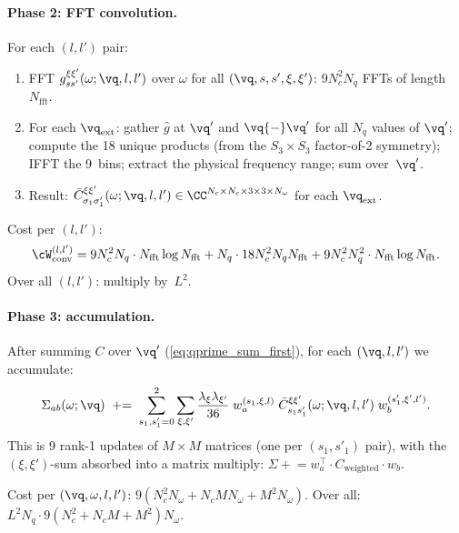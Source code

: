 \paragraph{Phase 2: FFT convolution.}
For each $(l, l')$ pair:
\begin{enumerate}
  \item FFT $g_{ss'}^{\xi\xi'}(\omega; \vq, l, l')$ over $\omega$
    for all $(\vq, s, s', \xi, \xi')$:
    $9 N_c^2 N_q$ FFTs of length $N_\mathrm{fft}$.
  \item For each $\vq_\mathrm{ext}$: gather $\hat{g}$ at $\vq'$ and
    $\vq{-}\vq'$ for all $N_q$ values of $\vq'$; compute the 18 unique
    products (from the $S_3\times S_3$ factor-of-2 symmetry); IFFT the
    9~bins; extract the physical frequency range; sum over~$\vq'$.
  \item Result:
    $\bar{C}^{\xi\xi'}_{\sigma_1\sigma'_1}(\omega; \vq, l, l')
    \in \CC^{N_c \times N_c \times 3 \times 3 \times N_\omega}$
    for each $\vq_\mathrm{ext}$.
\end{enumerate}
Cost per $(l, l')$:
\begin{equation}
  \cW_\mathrm{conv}^{(l,l')}
  = 9 N_c^2 N_q \cdot N_\mathrm{fft} \log N_\mathrm{fft}
  + N_q \cdot 18 N_c^2 N_q N_\mathrm{fft}
  + 9 N_c^2 N_q^2 \cdot N_\mathrm{fft} \log N_\mathrm{fft}.
\end{equation}
Over all $(l, l')$: multiply by~$L^2$.

\paragraph{Phase 3: accumulation.}
After summing $C$ over $\vq'$ (\cref{eq:qprime_sum_first}), for
each $(\vq, l, l')$ we accumulate:
\begin{equation}
  \Sigma_{ab}(\omega; \vq)
  \;\mathrel{+}=\;
  \sum_{s_1, s'_1 = 0}^{2}
  \sum_{\xi, \xi'}
  \frac{\lambda_\xi \lambda_{\xi'}}{36}\;
  w_a^{(s_1,\xi,l)}\;
  \bar{C}^{\xi\xi'}_{s_1 s'_1}(\omega; \vq, l, l')\;
  w_b^{(s'_1,\xi',l')}.
\end{equation}
This is 9 rank-1 updates of $M \times M$ matrices (one per $(s_1, s'_1)$
pair), with the $(\xi, \xi')$-sum absorbed into a matrix multiply:
$\Sigma \mathrel{+}= w_a^\intercal \cdot C_\mathrm{weighted} \cdot w_b$.

Cost per $(\vq, \omega, l, l')$: $9(N_c^2 N_\omega + N_c M N_\omega + M^2 N_\omega)$.
Over all: $L^2 N_q \cdot 9(N_c^2 + N_c M + M^2) N_\omega$.


